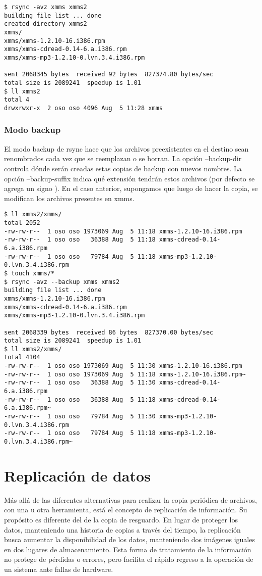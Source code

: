 \begin{lstlisting}
$ rsync -avz xmms xmms2
building file list ... done
created directory xmms2
xmms/
xmms/xmms-1.2.10-16.i386.rpm
xmms/xmms-cdread-0.14-6.a.i386.rpm
xmms/xmms-mp3-1.2.10-0.lvn.3.4.i386.rpm

sent 2068345 bytes  received 92 bytes  827374.80 bytes/sec
total size is 2089241  speedup is 1.01
$ ll xmms2
total 4
drwxrwxr-x  2 oso oso 4096 Aug  5 11:28 xmms
\end{lstlisting}

\subsubsection{Modo backup}
El modo backup de rsync hace que los archivos preexistentes en el destino sean renombrados cada vez que se reemplazan o se borran. La opción --backup-dir controla dónde serán creadas estas copias de backup con nuevos nombres. La opción --backup-suffix indica qué extensión tendrán estos archivos (por defecto se agrega un signo \quotes{\textasciitilde}).
En el caso anterior, supongamos que luego de hacer la copia, se modifican los archivos presentes en xmms.

\begin{lstlisting}
$ ll xmms2/xmms/
total 2052
-rw-rw-r--  1 oso oso 1973069 Aug  5 11:18 xmms-1.2.10-16.i386.rpm
-rw-rw-r--  1 oso oso   36388 Aug  5 11:18 xmms-cdread-0.14-6.a.i386.rpm
-rw-rw-r--  1 oso oso   79784 Aug  5 11:18 xmms-mp3-1.2.10-0.lvn.3.4.i386.rpm
$ touch xmms/*
$ rsync -avz --backup xmms xmms2
building file list ... done
xmms/xmms-1.2.10-16.i386.rpm
xmms/xmms-cdread-0.14-6.a.i386.rpm
xmms/xmms-mp3-1.2.10-0.lvn.3.4.i386.rpm

sent 2068339 bytes  received 86 bytes  827370.00 bytes/sec
total size is 2089241  speedup is 1.01
$ ll xmms2/xmms/
total 4104
-rw-rw-r--  1 oso oso 1973069 Aug  5 11:30 xmms-1.2.10-16.i386.rpm
-rw-rw-r--  1 oso oso 1973069 Aug  5 11:18 xmms-1.2.10-16.i386.rpm~
-rw-rw-r--  1 oso oso   36388 Aug  5 11:30 xmms-cdread-0.14-6.a.i386.rpm
-rw-rw-r--  1 oso oso   36388 Aug  5 11:18 xmms-cdread-0.14-6.a.i386.rpm~
-rw-rw-r--  1 oso oso   79784 Aug  5 11:30 xmms-mp3-1.2.10-0.lvn.3.4.i386.rpm
-rw-rw-r--  1 oso oso   79784 Aug  5 11:18 xmms-mp3-1.2.10-0.lvn.3.4.i386.rpm~
\end{lstlisting}

\section{Replicación de datos} 
Más allá de las diferentes alternativas para realizar la copia periódica de archivos, con una u otra herramienta, está el concepto de replicación de información. Su propósito es diferente del de la copia de resguardo. En lugar de proteger los datos, manteniendo una historia de copias a través del tiempo, la replicación busca aumentar la disponibilidad de los datos, manteniendo dos imágenes iguales en dos lugares de almacenamiento. Esta forma de tratamiento de la información no protege de pérdidas o errores, pero facilita el rápido regreso a la operación de un sistema ante fallas de hardware.
 
